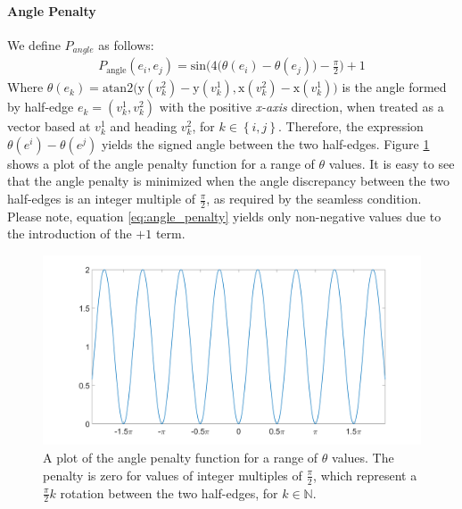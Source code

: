 \paragraph{Angle Penalty}
We define $P_{angle}$ as follows:
\begin{equation}\label{eq:angle_penalty}
\begin{split}
P_{\mathrm{angle}}\left(e_i,e_j\right) = \mathrm{sin} \bigg( 4\Big(\theta\left(e_i\right) - \theta\left(e_j\right)\Big) - \frac{\pi}{2}\bigg) + 1
\end{split}
\end{equation}
Where $\theta\left(e_k\right) = \mathrm{atan2}\Big(\mathrm{y}\left(v_k^2\right) - \mathrm{y}\left(v_k^1\right), \mathrm{x}\left(v_k^2\right) - \mathrm{x}\left(v_k^1\right)\Big)$ is the angle formed by half-edge $e_k = \left(v^1_k, v^2_k\right)$ with the positive \emph{x-axis} direction, when treated as a vector based at $v_k^1$ and heading $v_k^2$, for $k \in \left\{i,j\right\}$. Therefore, the expression $\theta\left(e^i\right) - \theta\left(e^j\right)$ yields the signed angle between the two half-edges. Figure \ref{fig:angle_penalty} shows a plot of the angle penalty function for a range of $\theta$ values. It is easy to see that the angle penalty is minimized when the angle discrepancy between the two half-edges is an integer multiple of $\frac{\pi}{2}$, as required by the seamless condition. Please note, equation \ref{eq:angle_penalty} yields only non-negative values due to the introduction of the $+1$ term.
\begin{figure}[ht]
\centering
\includegraphics[width=12cm]{figures/seamless/angle_penalty_function.png}
\caption[The Angle Penalty Function]{A plot of the angle penalty function for a range of $\theta$ values. The penalty is zero for values of integer multiples of $\frac{\pi}{2}$, which represent a $\frac{\pi}{2}k$ rotation between the two half-edges, for $k \in \mathbb{N}$.}
\label{fig:angle_penalty}
\end{figure}
